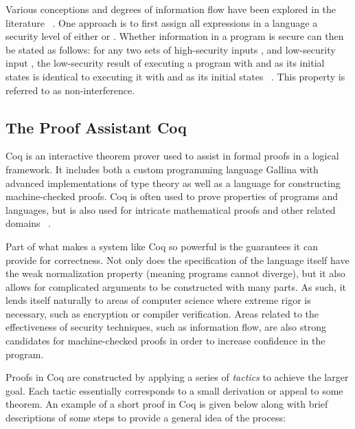 \documentclass[12pt]{report}
\begin{document}
Various conceptions and degrees of information flow have been
explored in the literature ~\cite{DBLP:journals/jcs/VolpanoIS96,
DBLP:journals/jsac/SabelfeldM03}. One approach is to first assign all
expressions in a language a security level of either 
or . Whether information in a program is secure can
then be stated as follows: for any two sets of high-security inputs
,  and low-security input ,
the low-security result of executing a program with 
and  as its initial states is identical to executing it
with  and  as its initial states
~\cite{DBLP:journals/jsac/SabelfeldM03}.  This property is referred
to as non-interference.


\subsection{The Proof Assistant Coq}



Coq is an interactive theorem prover used to assist in formal proofs
in a logical framework. It includes both a custom programming
language Gallina with advanced implementations of type theory as well
as a language for constructing machine-checked proofs. Coq is often
used to prove properties of programs and languages, but is also used
for intricate mathematical proofs and other related domains
~\cite{coq}.

Part of what makes a system like Coq so powerful is the guarantees it
can provide for correctness. Not only does the specification of the
language itself have the weak normalization property (meaning
programs cannot diverge), but it also allows for complicated
arguments to be constructed with many parts. As such, it lends itself
naturally to areas of computer science where extreme rigor is
necessary, such as encryption or compiler verification. Areas related
to the effectiveness of security techniques, such as information
flow, are also strong candidates for machine-checked proofs in order
to increase confidence in the program.


Proofs in Coq are constructed by applying a series of \emph{tactics}
to achieve the larger goal. Each tactic essentially corresponds to
a small derivation or appeal to some theorem. An example of a short
proof in Coq is given below along with brief descriptions of some
steps to provide a general idea of the process:
\end{document}
